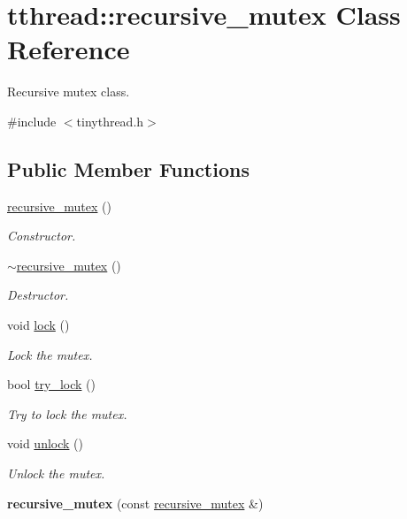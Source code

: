 \hypertarget{classtthread_1_1recursive__mutex}{}\section{tthread\+:\+:recursive\+\_\+mutex Class Reference}
\label{classtthread_1_1recursive__mutex}


Recursive mutex class.  




{\ttfamily \#include $<$tinythread.\+h$>$}

\subsection*{Public Member Functions}
\begin{DoxyCompactItemize}
\item 
\hyperlink{classtthread_1_1recursive__mutex_aa3f7469b6bdb9aca461f55ee03a49726}{recursive\+\_\+mutex} ()\hypertarget{classtthread_1_1recursive__mutex_aa3f7469b6bdb9aca461f55ee03a49726}{}\label{classtthread_1_1recursive__mutex_aa3f7469b6bdb9aca461f55ee03a49726}

\begin{DoxyCompactList}\small\item\em Constructor. \end{DoxyCompactList}\item 
\hyperlink{classtthread_1_1recursive__mutex_ab35d8df5aecdf77cc6e2394ff6aef34d}{$\sim$recursive\+\_\+mutex} ()\hypertarget{classtthread_1_1recursive__mutex_ab35d8df5aecdf77cc6e2394ff6aef34d}{}\label{classtthread_1_1recursive__mutex_ab35d8df5aecdf77cc6e2394ff6aef34d}

\begin{DoxyCompactList}\small\item\em Destructor. \end{DoxyCompactList}\item 
void \hyperlink{classtthread_1_1recursive__mutex_ae8c3a0336f41749be4d8020e6b2c44bc}{lock} ()
\begin{DoxyCompactList}\small\item\em Lock the mutex. \end{DoxyCompactList}\item 
bool \hyperlink{classtthread_1_1recursive__mutex_af52aa48b39013cc2036448314040325d}{try\+\_\+lock} ()
\begin{DoxyCompactList}\small\item\em Try to lock the mutex. \end{DoxyCompactList}\item 
void \hyperlink{classtthread_1_1recursive__mutex_a3a351a53fd737fa9b3ecbe063a17393f}{unlock} ()
\begin{DoxyCompactList}\small\item\em Unlock the mutex. \end{DoxyCompactList}\item 
{\bfseries recursive\+\_\+mutex} (const \hyperlink{classtthread_1_1recursive__mutex}{recursive\+\_\+mutex} \&)\hypertarget{classtthread_1_1recursive__mutex_a36d41e533d43341412905cea767b98b2}{}\label{classtthread_1_1recursive__mutex_a36d41e533d43341412905cea767b98b2}


\end{DoxyCompactItemize}
